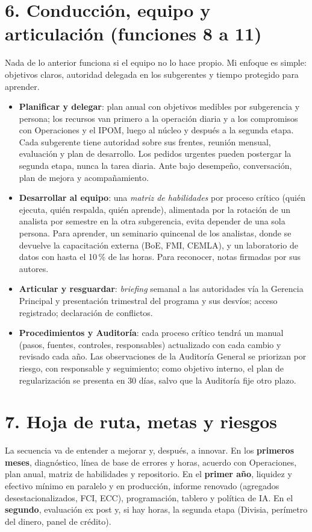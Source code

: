 \documentclass[11pt,a4paper]{article}
\begin{document}
\section*{6. Conducción, equipo y articulación (funciones 8 a 11)}
Nada de lo anterior funciona si el equipo no lo hace propio. Mi enfoque es simple: objetivos claros, autoridad delegada en los subgerentes y tiempo protegido para aprender.
\begin{itemize}
\item \textbf{Planificar y delegar}: plan anual con objetivos medibles por subgerencia y persona; los recursos van primero a la operación diaria y a los compromisos con Operaciones y el IPOM, luego al núcleo y después a la segunda etapa. Cada subgerente tiene autoridad sobre sus frentes, reunión mensual, evaluación y plan de desarrollo. Los pedidos urgentes pueden postergar la segunda etapa, nunca la tarea diaria. Ante bajo desempeño, conversación, plan de mejora y acompañamiento.
\item \textbf{Desarrollar al equipo}: una \emph{matriz de habilidades} por proceso crítico (quién ejecuta, quién respalda, quién aprende), alimentada por la rotación de un analista por semestre en la otra subgerencia, evita depender de una sola persona. Para aprender, un seminario quincenal de los analistas, donde se devuelve la capacitación externa (BoE, FMI, CEMLA), y un laboratorio de datos con hasta el 10\,\% de las horas. Para reconocer, notas firmadas por sus autores.
\item \textbf{Articular y resguardar}: \emph{briefing} semanal a las autoridades vía la Gerencia Principal y presentación trimestral del programa y sus desvíos; acceso registrado; declaración de conflictos.
\item \textbf{Procedimientos y Auditoría}: cada proceso crítico tendrá un manual (pasos, fuentes, controles, responsables) actualizado con cada cambio y revisado cada año. Las observaciones de la Auditoría General se priorizan por riesgo, con responsable y seguimiento; como objetivo interno, el plan de regularización se presenta en 30 días, salvo que la Auditoría fije otro plazo.
\end{itemize}

\section*{7. Hoja de ruta, metas y riesgos}
La secuencia va de entender a mejorar y, después, a innovar. En los \textbf{primeros meses}, diagnóstico, línea de base de errores y horas, acuerdo con Operaciones, plan anual, matriz de habilidades y repositorio. En el \textbf{primer año}, liquidez y efectivo mínimo en paralelo y en producción, informe renovado (agregados desestacionalizados, FCI, ECC), programación, tablero y política de IA. En el \textbf{segundo}, evaluación ex post y, si hay horas, la segunda etapa (Divisia, perímetro del dinero, panel de crédito).
\end{document}
